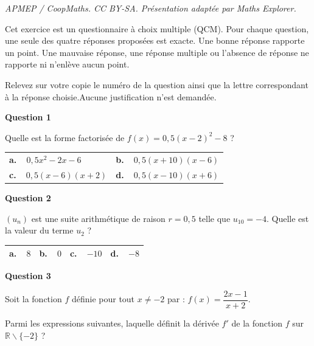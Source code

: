 \documentclass[10pt]{article}
\providecommand{\R}{\mathbb{R}}
\begin{document}
\noindent\textit{APMEP / CoopMaths. CC BY-SA. Présentation adaptée par Maths Explorer.}\par\medskip
\medskip

Cet exercice est un questionnaire à choix multiple (QCM). Pour chaque question, une seule des quatre réponses proposées est exacte. Une bonne réponse rapporte un point. Une mauvaise réponse, une réponse multiple ou l'absence de réponse ne rapporte ni n'enlève aucun point.

Relevez sur votre copie le numéro de la question ainsi que la lettre correspondant à la réponse choisie.Aucune justification n'est demandée.

\bigskip

\textbf{Question 1}

\medskip

Quelle est la forme factorisée de $f(x) = 0,5(x - 2)^2 - 8$ ?

\begin{center}
\begin{tabularx}{\linewidth}{|*{2}{X|}}\hline
\textbf{a.~~}$0,5x^2 - 2x - 6$&\textbf{b.~~}$0,5(x + 10)(x - 6)$\\
\textbf{c.~~}$0,5(x - 6)(x + 2)$&\textbf{d.~~}$0,5(x - 10)(x + 6)$\\ \hline
\end{tabularx}
\end{center}

\medskip

\textbf{Question 2}

\medskip

$\left(u_n\right)$ est une suite arithmétique de raison $r = 0,5$ telle que $u_{10} = -4$. Quelle est la valeur du terme $u_2$ ?

\begin{center}
\begin{tabularx}{\linewidth}{|*{4}{X|}}\hline
\textbf{a.~~}$8$&\textbf{b.~~}$0$&\textbf{c.~~}$- 10$&\textbf{d.~~}$- 8$\\ \hline
\end{tabularx}
\end{center}

\medskip

\textbf{Question 3}

\medskip

Soit la fonction $f$ définie pour tout $x \ne -2$ par : $f(x) = \dfrac{2x - 1}{x+2}$.

Parmi les expressions  suivantes, laquelle définit la dérivée $f'$ de la fonction $f$ sur 
$\R\backslash \{-2\}$ ?
\end{document}
